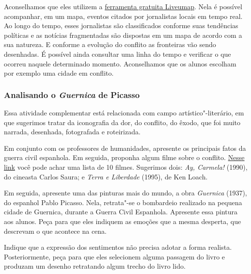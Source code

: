\documentclass[12pt]{extarticle}
\begin{document}

Aconselhamos que eles utilizem a \href{https://liveuamap.com/}{ferramenta gratuita Liveumap}. 
Nela é possível acompanhar, em um mapa, eventos citados por jornalistas locais 
em tempo real. Ao longo do tempo, esses jornalistas são classificados conforme
suas tendências políticas e as notícias fragmentadas são dispostas em 
um mapa de acordo com a sua natureza. E conforme a evolução do conflito as fronteiras
vão sendo desenhadas. É possível ainda consultar uma linha do tempo e 
verificar o que ocorreu naquele determinado momento. Aconselhamos que 
os alunos escolham por exemplo uma cidade em conflito.  

\subsubsection{Analisando o \emph{Guernica} de Picasso}

Essa atividade complementar está relacionada com campo artístico"-literário,
em que sugerimos tratar da
iconografia da dor, do conflito, do êxodo, que foi muito narrada,
desenhada, fotografada e roteirizada. 


Em conjunto com os professores de
humanidades, apresente os principais fatos da guerra civil espanhola. 
Em seguida, proponha algum filme sobre o conflito. 
\href{https://www.brasildefato.com.br/2020/07/18/no-pasaran-10-filmes-sobre-a-guerra-civil-espanhola}{Nesse link} 
você pode achar uma lista de 10 filmes. Sugerimos dois: \emph{Ay, Carmela!} (1990), 
do cineasta Carlos Saura; e  \textit{Terra e Liberdade} (1995), de Ken Loach.

Em seguida, apresente uma das pinturas mais
do mundo, a obra \emph{Guernica} (1937), do espanhol Pablo Picasso. Nela,
retrata"-se o bombardeio realizado na pequena cidade de Guernica,
durante a Guerra Civil Espanhola. Apresente essa pintura aos alunos.
Peça para que eles indiquem as emoções que a mesma desperta, que
descrevam o que acontece na cena. 

Indique que a expressão dos
sentimentos não precisa adotar a forma realista. Posteriormente, peça
para que eles selecionem alguma passagem do livro e produzam um
desenho retratando algum trecho do livro lido. 

\end{document}
